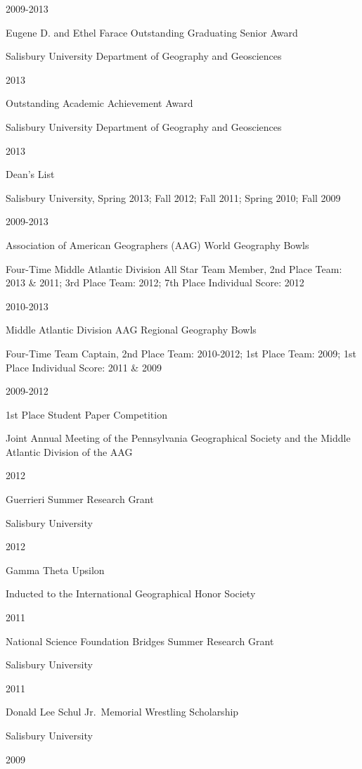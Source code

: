 \documentclass[
]{article}
\begin{document}
2009-2013

Eugene D. and Ethel Farace Outstanding Graduating Senior Award

Salisbury University Department of Geography and Geosciences

2013

Outstanding Academic Achievement Award

Salisbury University Department of Geography and Geosciences

2013

Dean's List

Salisbury University, Spring 2013; Fall 2012; Fall 2011; Spring 2010;
Fall 2009

2009-2013

Association of American Geographers (AAG) World Geography Bowls

Four-Time Middle Atlantic Division All Star Team Member, 2nd Place Team:
2013 \& 2011; 3rd Place Team: 2012; 7th Place Individual Score: 2012

2010-2013

Middle Atlantic Division AAG Regional Geography Bowls

Four-Time Team Captain, 2nd Place Team: 2010-2012; 1st Place Team: 2009;
1st Place Individual Score: 2011 \& 2009

2009-2012

1st Place Student Paper Competition

Joint Annual Meeting of the Pennsylvania Geographical Society and the
Middle Atlantic Division of the AAG

2012

Guerrieri Summer Research Grant

Salisbury University

2012

Gamma Theta Upsilon

Inducted to the International Geographical Honor Society

2011

National Science Foundation Bridges Summer Research Grant

Salisbury University

2011

Donald Lee Schul Jr.~Memorial Wrestling Scholarship

Salisbury University

2009
\end{document}
